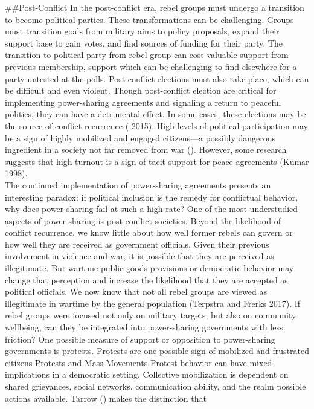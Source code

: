 \documentclass[11pt,]{article}
\begin{document}
\#\#Post-Conflict In the post-conflict era, rebel groups must undergo a
transition to become political parties. These transformations can be
challenging. Groups must transition goals from military aims to policy
proposals, expand their support base to gain votes, and find sources of
funding for their party. The transition to political party from rebel
group can cost valuable support from previous membership, support which
can be challenging to find elsewhere for a party untested at the polls.
Post-conflict elections must also take place, which can be difficult and
even violent. Though post-conflict election are critical for
implementing power-sharing agreements and signaling a return to peaceful
politics, they can have a detrimental effect. In some cases, these
elections may be the source of conflict recurrence
(\citet{keels_oil_nodate} 2015). High levels of political participation
may be a sign of highly mobilized and engaged citizens---a possibly
dangerous ingredient in a society not far removed from war
(\citet{letsa_voting_2017}). However, some research suggests that high
turnout is a sign of tacit support for peace agreements (Kumar 1998).\\
The continued implementation of power-sharing agreements presents an
interesting paradox: if political inclusion is the remedy for
conflictual behavior, why does power-sharing fail at such a high rate?
One of the most understudied aspects of power-sharing is post-conflict
societies. Beyond the likelihood of conflict recurrence, we know little
about how well former rebels can govern or how well they are received as
government officials. Given their previous involvement in violence and
war, it is possible that they are perceived as illegitimate. But wartime
public goods provisions or democratic behavior may change that
perception and increase the likelihood that they are accepted as
political officials. We now know that not all rebel groups are viewed as
illegitimate in wartime by the general population (Terpstra and Frerks
2017). If rebel groups were focused not only on military targets, but
also on community wellbeing, can they be integrated into power-sharing
governments with less friction? One possible measure of support or
opposition to power-sharing governments is protests. Protests are one
possible sign of mobilized and frustrated citizens Protests and Mass
Movements Protest behavior can have mixed implications in a democratic
setting. Collective mobilization is dependent on shared grievances,
social networks, communication ability, and the realm possible actions
available. Tarrow (\citet{tarrow_power_2011}) makes the distinction that
\end{document}
